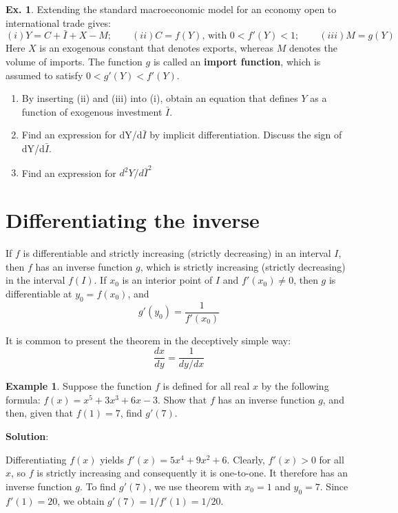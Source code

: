 \documentclass[10pt,a4paper]{book}
\theoremstyle{definition}\newtheorem{definition}{Definition}
\theoremstyle{definition}\newtheorem{fact}{Fact}
\theoremstyle{definition}\newtheorem{ex}{Ex.}
\theoremstyle{definition}\newtheorem{project}{Project}
\theoremstyle{definition}\newtheorem{problem}{Problem}
\theoremstyle{definition}\newtheorem{example}{Example}
\numberwithin{theorem}{chapter}
\numberwithin{corollary}{chapter}
\numberwithin{assumption}{chapter}
\numberwithin{definition}{chapter}
\numberwithin{prop}{chapter}
\numberwithin{notation}{chapter}
\numberwithin{problem}{chapter}
\numberwithin{example}{chapter}
\numberwithin{fact}{chapter}
\numberwithin{ex}{chapter}
\begin{document}
	\begin{ex}
		Extending the standard macroeconomic model for an economy open to international trade gives:
		\begin{equation*}
			(i) Y=C+\bar{I}+X-M; \qquad
			(ii) C = f(Y) \text{, with } 0<f'(Y)<1; \qquad
			(iii) M=g(Y)
		\end{equation*}
		Here $X$ is an exogenous constant that denotes exports, whereas $M$ denotes the volume of imports.
		The function $g$ is called an \textbf{import function}, which is assumed to satisfy $0 < g'(Y) < f'(Y)$.
		\begin{enumerate}[label=(\alph*)]
			\item By inserting (ii) and (iii) into (i), obtain an equation that defines $Y$ as a function of exogenous investment $\bar{I}$.
			\item Find an expression for dY/d$\bar{I}$ by implicit differentiation. Discuss the sign of dY/d$\bar{I}$.
			\item Find an expression for $d^2Y/d\bar{I}^2$
		\end{enumerate}
	\end{ex}
	
	\section{Differentiating the inverse}
	
	If $f$ is differentiable and strictly increasing (strictly decreasing) in an interval $I$, then $f$ has an inverse function $g$, which is strictly increasing (strictly decreasing) in the interval $f(I)$. If $x_0$ is an interior point of $I$ and $f'(x_0) \neq 0$, then $g$ is differentiable at $y_0 = f(x_0)$, and
	$$g'(y_0)=\frac{1}{f'(x_0)}$$
	
	It is common to present the theorem in the deceptively simple way:
	$$\frac{dx}{dy}=\frac{1}{dy/dx}$$
	
	\begin{example}
		Suppose the function $f$ is defined for all real $x$ by the following formula: $f (x) = x^5 + 3x^3 + 6x - 3$. Show that $f$ has an inverse function $g$, and then, given that $f(1) = 7$, find $g'(7)$.
		
		\textbf{Solution}:
		
		Differentiating $f (x)$ yields $f'(x) = 5x^4 + 9x^2 + 6$. Clearly, $f' (x) > 0$ for all $x$, so $f$ is strictly increasing and consequently it is one-to-one. It therefore has an inverse function $g$. To find $g'(7)$, we use theorem with $x_0 = 1$ and $y_0 = 7$. Since $f'(1) = 20$, we obtain $g'(7) = 1/f'(1) = 1/20$.
	\end{example}
	
\end{document}
